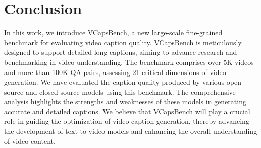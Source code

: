 \section{Conclusion}
In this work, we introduce VCapsBench, a new large-scale fine-grained benchmark for evaluating video caption quality. VCapsBench is meticulously designed to support detailed long captions, aiming to advance research and benchmarking in video understanding. The benchmark comprises over 5K videos and more than 100K QA-pairs, assessing 21 critical dimensions of video generation. We have evaluated the caption quality produced by various open-source and closed-source models using this benchmark. The comprehensive analysis highlights the strengths and weaknesses of these models in generating accurate and detailed captions. We believe that VCapsBench will play a crucial role in guiding the optimization of video caption generation, thereby advancing the development of text-to-video models and enhancing the overall understanding of video content.



